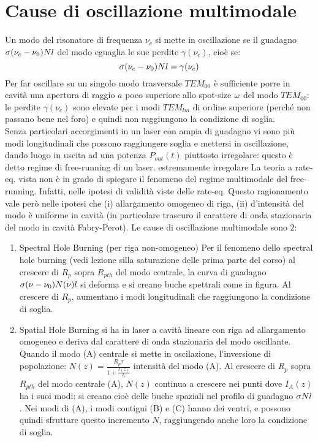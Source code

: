 \section*{Cause di oscillazione multimodale}
Un modo del risonatore di frequenza $\nu_c$ si mette in oscillazione se il guadagno $\sigma (\nu_c - \nu_0) Nl$ del modo eguaglia le sue perdite $\gamma(\nu_c)$, cioè se:
\begin{equation*}
\sigma (\nu_c - \nu_0) Nl = \gamma(\nu_c)
\end{equation*}
Per far oscillare su un singolo modo trasversale $TEM_{00}$ è sufficiente porre in cavità una apertura di raggio $a$ poco superiore allo spot-size $\omega$ del modo $TEM_{00}$:
le perdite $\gamma(\nu_c)$ sono elevate per i modi $TEM_{lm}$ di ordine superiore (perché non passano bene nel foro) e quindi non raggiungono la condizione di soglia.\\
Senza particolari accorgimenti in un laser con ampia di guadagno vi sono più modi longitudinali che possono raggiungere soglia e mettersi in oscillazione, dando luogo in uscita ad una potenza $P_{out}(t)$ piuttosto irregolare: questo è detto regime di free-running di un laser.
estremamente irregolare
La teoria a rate-eq. vista non è in grado di spiegare il fenomeno del regime multimodale del free-running. Infatti, nelle ipotesi di validità viste delle rate-eq.
Questo ragionamento vale però nelle ipotesi che (i) allargamento omogeneo di riga, (ii) d'intensità del modo è uniforme in cavità (in particolare trascuro il carattere di onda stazionaria del modo in cavità Fabry-Perot).
Le cause di oscillazione multimodale sono 2:
\begin{enumerate}
\item Spectral Hole Burning (per riga non-omogeneo)
Per il fenomeno dello spectral hole burning (vedi lezione silla saturazione delle prima parte del corso) al crescere di $R_p$ sopra $R_{p th}$ del modo centrale, la curva di guadagno $\sigma (\nu - \nu_0) N(\nu)l$ si deforma e si creano buche spettrali come in figura.
Al crescere di $R_p$, aumentano i modi longitudinali che raggiungono la condizione di soglia.
\item Spatial Hole Burning si ha in laser a cavità lineare con riga ad allargamento omogeneo e deriva dal carattere di onda stazionaria del modo oscillante.
Quando il modo (A) centrale si mette in oscilazione, l'inversione di popolazione: $N(z) = \frac{R_p \tau}{1 + \frac{I(z)}{I_s}}$ intensità del modo (A).
Al crescere di $R_p$ sopra $R_{p th}$ del modo centrale (A), $N(z)$ continua a crescere nei punti dove $I_A(z)$ ha i suoi modi: si creano cioè delle buche spaziali nel profilo di guadagno $\sigma N l$. Nei modi di (A), i modi contigui (B) e (C) hanno dei ventri, e possono quindi sfruttare questo incremento $N$, raggiungendo anche loro la condizione di soglia.
\end{enumerate}

